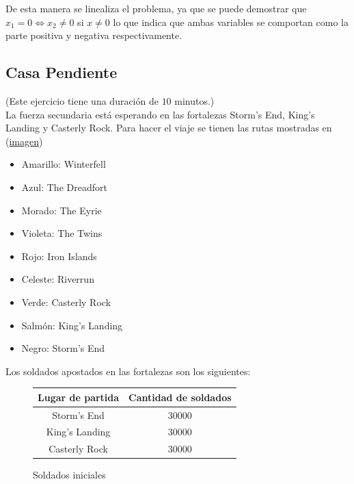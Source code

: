 \documentclass[a4paper,10pt,twocolumn]{article}
\theoremstyle{theorem}
\theoremstyle{definition}
\theoremstyle{remark}
\begin{document}
De esta manera se linealiza el problema, ya que se puede demostrar que $x_1 = 0 \iff x_2 \neq 0$ si $x \neq 0$ lo que indica que ambas variables se comportan como la parte positiva y negativa respectivamente.


	\subsection{Casa Pendiente}\label{subsec:ejer_3}
(Este ejercicio tiene una duración de $10$ minutos.)\\

La fuerza secundaria está esperando en las fortalezas Storm's End, King's Landing y Casterly Rock. Para hacer el viaje se tienen las rutas mostradas en (\hyperref[fig:ejer_6_map]{imagen})

\begin{itemize}

	\item Amarillo: Winterfell
	\item Azul: The Dreadfort
	\item Morado: The Eyrie
	\item Violeta: The Twins
	\item Rojo: Iron Islands
	\item Celeste: Riverrun
	\item Verde: Casterly Rock
	\item Salmón: King's Landing
	\item Negro: Storm's End

\end{itemize}

Los soldados apostados en las fortalezas son los siguientes:

\begin{figure}[h!]%
	\begin{center}
		\begin{tabular}{|c|c|} \hline
		Lugar de partida & Cantidad de soldados  \\ \hline
		Storm's End		 & 30000				 \\ \hline
		King's Landing 	 & 30000				 \\ \hline
		Casterly Rock 	 & 30000		   		 \\ \hline
		\end{tabular}
	\caption{Soldados iniciales}\label{fig:ejer_6_1}
	\end{center}
\end{figure}
\end{document}
